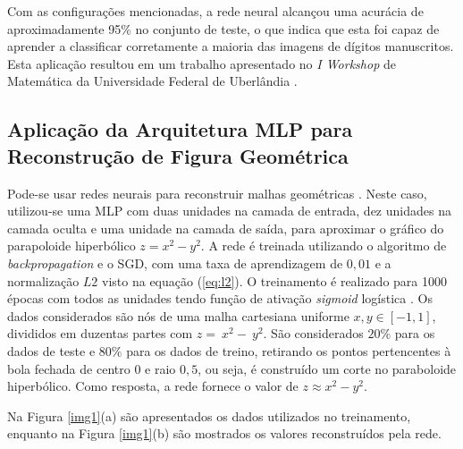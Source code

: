 Com as configurações mencionadas, a rede neural alcançou uma acurácia de aproximadamente 95\% no conjunto de teste, o que indica que esta foi capaz de aprender a classificar corretamente a maioria das imagens de dígitos manuscritos. Esta aplicação resultou em um trabalho apresentado no \textit{I Workshop} de Matemática da Universidade Federal de Uberlândia \cite{Sena2025}.

\subsection{Aplicação da Arquitetura MLP para Reconstrução de Figura Geométrica}
Pode-se usar redes neurais para reconstruir malhas geométricas \cite{Sena2024}. Neste caso, utilizou-se uma MLP com duas unidades na camada de entrada, dez unidades na camada oculta e uma unidade na camada de saída, para aproximar o gráfico do parapoloide hiperbólico $z = x^2 - y^2$. A rede é treinada utilizando o algoritmo de \textit{backpropagation} e o SGD, com uma taxa de aprendizagem de $0,01$ e a normalização $L2$ visto na equação (\ref{eq:l2}). O treinamento é realizado para 1000 épocas com todos as unidades tendo função de ativação \textit{sigmoid} logística . Os dados considerados são nós de uma malha cartesiana uniforme $x,y \in [-1,1]$, divididos em duzentas partes  com $z =~x^2 -~y^2$. São considerados $20\%$ para os dados de teste e $80\%$ para os dados de treino, retirando os pontos pertencentes à bola fechada de centro $0$ e raio $0,5$, ou seja, é construído um corte no paraboloide hiperbólico. Como resposta, a rede fornece o valor de $z \approx x^2 - y^2$.

Na Figura \ref{img1}(a) são apresentados os dados utilizados no treinamento, enquanto na Figura \ref{img1}(b) são mostrados os valores reconstruídos pela rede.

